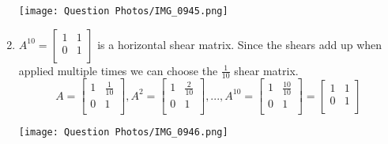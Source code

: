\begin{SaveQuestion}
\begin{enumerate}
        \begin{center}
        \texttt{[image: Question Photos/IMG\_0945.png]}
        \end{center}
    \item  $A^{10}=
        \begin{bmatrix} 
	1 & 1 \\
	0 & 1 \\
	\end{bmatrix}$ is a horizontal shear matrix. Since the shears add up when applied multiple times we can choose the $\frac{1}{10}$ shear matrix.
        $$A = 
        \begin{bmatrix} 
	1 & \frac{1}{10} \\
	0 & 1 \\
	\end{bmatrix}, 
        A^2 = 
        \begin{bmatrix} 
	1 & \frac{2}{10} \\
	0 & 1 \\
	\end{bmatrix}, ... ,
        A^{10} = 
        \begin{bmatrix} 
	1 & \frac{10}{10} \\
	0 & 1 \\
	\end{bmatrix} =
        \begin{bmatrix} 
	1 & 1 \\
	0 & 1 \\
	\end{bmatrix}$$
 \begin{center}
        \texttt{[image: Question Photos/IMG\_0946.png]}
        \end{center}
    \end{enumerate}
\end{SaveQuestion}


